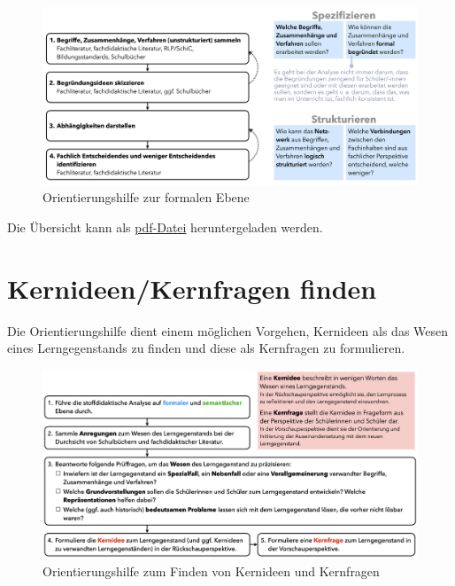 \documentclass[
]{scrbook}
\theoremstyle{definition}
\theoremstyle{definition}
\theoremstyle{definition}
\theoremstyle{definition}
\theoremstyle{remark}
\begin{document}
\begin{figure}

{\centering \includegraphics[width=0.9\linewidth]{pictures/C-OrientierungshilfeFormaleEbene} 

}

\caption{Orientierungshilfe zur formalen Ebene}\label{fig:OrientierungFormal}
\end{figure}

Die Übersicht kann als \href{files/Stoffdidaktik2024-OrientierungshilfeFormaleEbene.pdf}{pdf-Datei} heruntergeladen werden.

\section{Kernideen/Kernfragen finden}\label{orientierungshilfe-kernideen-finden}

Die Orientierungshilfe dient einem möglichen Vorgehen, Kernideen als das Wesen eines Lerngegenstands zu finden und diese als Kernfragen zu formulieren.

\begin{figure}

{\centering \includegraphics[width=0.9\linewidth]{pictures/C-OrientierungshilfeKernidee} 

}

\caption{Orientierungshilfe zum Finden von Kernideen und Kernfragen}\label{fig:OrientierungKernidee}
\end{figure}
\end{document}
